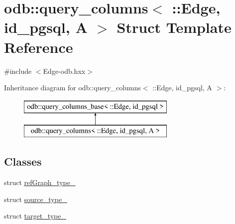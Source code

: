 \hypertarget{structodb_1_1query__columns_3_01_1_1_edge_00_01id__pgsql_00_01_a_01_4}{}\section{odb\+:\+:query\+\_\+columns$<$ \+:\+:Edge, id\+\_\+pgsql, A $>$ Struct Template Reference}
\label{structodb_1_1query__columns_3_01_1_1_edge_00_01id__pgsql_00_01_a_01_4}


{\ttfamily \#include $<$Edge-\/odb.\+hxx$>$}

Inheritance diagram for odb\+:\+:query\+\_\+columns$<$ \+:\+:Edge, id\+\_\+pgsql, A $>$\+:\begin{figure}[H]
\begin{center}
\leavevmode
\includegraphics[height=2.000000cm]{d5/d84/structodb_1_1query__columns_3_01_1_1_edge_00_01id__pgsql_00_01_a_01_4}
\end{center}
\end{figure}
\subsection*{Classes}
\begin{DoxyCompactItemize}
\item 
struct \hyperlink{structodb_1_1query__columns_3_01_1_1_edge_00_01id__pgsql_00_01_a_01_4_1_1ref_graph__type__}{ref\+Graph\+\_\+type\+\_\+}
\item 
struct \hyperlink{structodb_1_1query__columns_3_01_1_1_edge_00_01id__pgsql_00_01_a_01_4_1_1source__type__}{source\+\_\+type\+\_\+}
\item 
struct \hyperlink{structodb_1_1query__columns_3_01_1_1_edge_00_01id__pgsql_00_01_a_01_4_1_1target__type__}{target\+\_\+type\+\_\+}
\end{DoxyCompactItemize}
